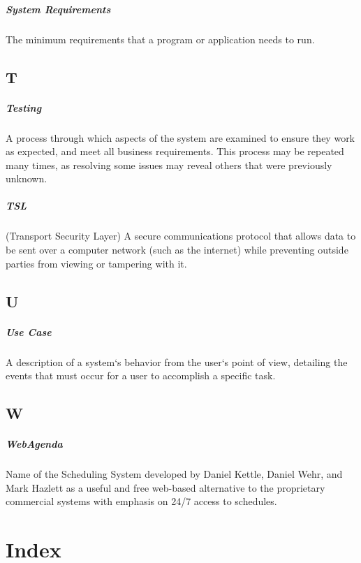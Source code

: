 \documentclass[letterpaper,12pt]{report}
\begin{document}
\paragraph{System Requirements} The minimum requirements that a program or application needs to run.
\section*{T}
\paragraph{Testing} A process through which aspects of the system are examined to ensure they work as expected, and meet all business requirements. This process may be repeated many times, as resolving some issues may reveal others that were previously unknown.
\paragraph{TSL} (Transport Security Layer) A secure communications protocol that allows data to be sent over a computer network (such as the internet) while preventing outside parties from viewing or tampering with it.
\section*{U}
\paragraph{Use Case} A description of a system`s behavior from the user`s point of view, detailing the events that must occur for a user to accomplish a specific task.
\section*{W}
\paragraph{WebAgenda} Name of the Scheduling System developed by Daniel Kettle, Daniel Wehr, and Mark Hazlett as a useful and free web-based alternative to the proprietary commercial systems with emphasis on 24/7 access to schedules.

\chapter{Index}
\printindex
\end{document}

